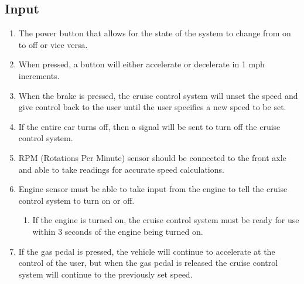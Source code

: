 \documentclass[preprint,11pt,3p]{article}
\begin{document}
\subsection{Input}
\begin{enumerate}
	\item The power button that allows for the state of the system to change from on to off or vice versa.
	\item When pressed, a button will either accelerate or decelerate in 1 mph increments. 
	\item When the brake is pressed, the cruise control system will unset the speed and give control back to the user until the user specifies a new speed to be set.
	\item If the entire car turns off, then a signal will be sent to turn off the cruise control system.
	\item RPM (Rotations Per Minute) sensor should be connected to the front axle and able to take readings for accurate speed calculations. 
	\item Engine sensor must be able to take input from the engine to tell the cruise control system to turn on or off.
		\begin{enumerate}
			\item If the engine is turned on, the cruise control system must be ready for use within 3 seconds of the engine being turned on.
		\end{enumerate}
	\item If the gas pedal is pressed, the vehicle will continue to accelerate at the control of the user, but when the gas pedal is released the cruise control system will continue to the previously set speed.
\end{enumerate}
\end{document}
